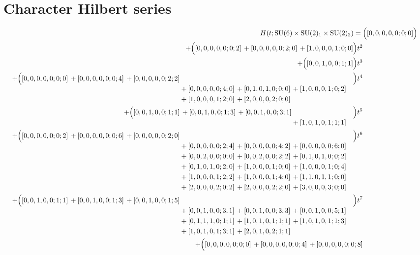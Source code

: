 \documentclass[10pt]{article}
\begin{document}
\section{Character Hilbert series}
\[
\begin{aligned}
H(t;\mathrm{SU}(6)\times\mathrm{SU(2)_1}\times\mathrm{SU(2)_2}) ={}&
   \Bigl([0,0,0,0,0;0;0]\Bigr) \\
  + \Bigl([0,0,0,0,0;0;2]\,+[0,0,0,0,0;2;0]\,+[1,0,0,0,1;0;0]\Bigr)t^{2} \\
  + \Bigl([0,0,1,0,0;1;1]\Bigr)t^{3} \\
  + \Bigl(\begin{aligned}[t][0,0,0,0,0;0;0]\,+[0,0,0,0,0;0;4]\,+[0,0,0,0,0;2;2] \\
  &{}+[0,0,0,0,0;4;0]\,+[0,1,0,1,0;0;0]\,+[1,0,0,0,1;0;2] \\
  &{}+[1,0,0,0,1;2;0]\,+[2,0,0,0,2;0;0]\end{aligned}\Bigr)t^{4} \\
  + \Bigl(\begin{aligned}[t][0,0,1,0,0;1;1]\,+[0,0,1,0,0;1;3]\,+[0,0,1,0,0;3;1] \\
  &{}+[1,0,1,0,1;1;1]\end{aligned}\Bigr)t^{5} \\
  + \Bigl(\begin{aligned}[t][0,0,0,0,0;0;2]\,+[0,0,0,0,0;0;6]\,+[0,0,0,0,0;2;0] \\
  &{}+[0,0,0,0,0;2;4]\,+[0,0,0,0,0;4;2]\,+[0,0,0,0,0;6;0] \\
  &{}+[0,0,2,0,0;0;0]\,+[0,0,2,0,0;2;2]\,+[0,1,0,1,0;0;2] \\
  &{}+[0,1,0,1,0;2;0]\,+[1,0,0,0,1;0;0]\,+[1,0,0,0,1;0;4] \\
  &{}+[1,0,0,0,1;2;2]\,+[1,0,0,0,1;4;0]\,+[1,1,0,1,1;0;0] \\
  &{}+[2,0,0,0,2;0;2]\,+[2,0,0,0,2;2;0]\,+[3,0,0,0,3;0;0]\end{aligned}\Bigr)t^{6} \\
  + \Bigl(\begin{aligned}[t][0,0,1,0,0;1;1]\,+[0,0,1,0,0;1;3]\,+[0,0,1,0,0;1;5] \\
  &{}+[0,0,1,0,0;3;1]\,+[0,0,1,0,0;3;3]\,+[0,0,1,0,0;5;1] \\
  &{}+[0,1,1,1,0;1;1]\,+[1,0,1,0,1;1;1]\,+[1,0,1,0,1;1;3] \\
  &{}+[1,0,1,0,1;3;1]\,+[2,0,1,0,2;1;1]\end{aligned}\Bigr)t^{7} \\
  + \Bigl(\begin{aligned}[t][0,0,0,0,0;0;0]\,+[0,0,0,0,0;0;4]\,+[0,0,0,0,0;0;8] \\

\end{aligned}
\end{aligned}\]
\end{document}
